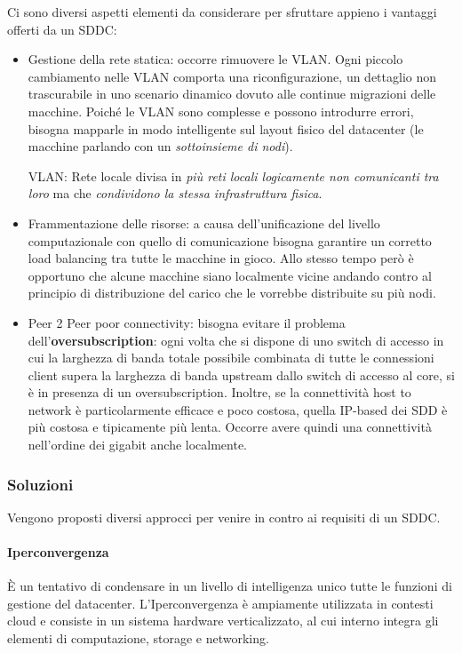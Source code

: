 \documentclass{article}
\begin{document}
		Ci sono diversi aspetti elementi da considerare per sfruttare appieno i vantaggi offerti da un SDDC:
		
		\begin{itemize}
		\item
		  Gestione della rete statica: occorre rimuovere le VLAN. Ogni piccolo cambiamento nelle VLAN comporta una riconfigurazione, un dettaglio non trascurabile in uno scenario dinamico dovuto alle continue migrazioni delle macchine. Poiché le VLAN sono
		  complesse e possono introdurre errori, bisogna mapparle in modo intelligente sul layout fisico del datacenter (le macchine parlando con un \emph{sottoinsieme di nodi}).
		
		  VLAN: Rete locale divisa in \emph{più reti locali logicamente non comunicanti tra loro} ma che \emph{condividono la stessa infrastruttura fisica}.
		\item
		  Frammentazione delle risorse: a causa dell'unificazione del livello computazionale con quello di comunicazione bisogna garantire un corretto load balancing tra tutte le macchine in gioco. Allo stesso tempo però è opportuno che alcune macchine siano localmente vicine andando contro al principio di distribuzione del carico che le vorrebbe distribuite su più nodi.
		\item
		  Peer 2 Peer poor connectivity: bisogna evitare il problema dell'\textbf{oversubscription}: ogni volta che si dispone di uno switch di accesso in cui la larghezza di banda totale possibile combinata di tutte le connessioni client supera la larghezza di banda upstream dallo switch di accesso al core, si è in presenza di un oversubscription.
		  Inoltre, se la connettività host to network è particolarmente efficace e poco costosa, quella IP-based dei SDD è più costosa e tipicamente più lenta. Occorre avere quindi una connettività nell'ordine dei gigabit anche localmente.
		\end{itemize}
		
		\subsubsection{Soluzioni}\label{soluzioni}
		Vengono proposti diversi approcci per venire in contro ai requisiti di un SDDC.
		
		\paragraph{Iperconvergenza}\label{iperconvergenza}
		
		È un tentativo di condensare in un livello di intelligenza
		unico tutte le funzioni di gestione del datacenter. L'Iperconvergenza è ampiamente utilizzata in contesti cloud e
		consiste in un sistema hardware verticalizzato, al cui interno integra gli elementi di computazione, storage e
		networking.
		
\end{document}
